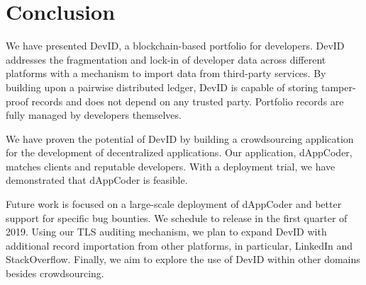 \section{Conclusion}
We have presented DevID, a blockchain-based portfolio for developers.
DevID addresses the fragmentation and lock-in of developer data across different platforms with a mechanism to import data from third-party services.
By building upon a pairwise distributed ledger, DevID is capable of storing tamper-proof records and does not depend on any trusted party.
Portfolio records are fully managed by developers themselves.

We have proven the potential of DevID by building a crowdsourcing application for the development of decentralized applications.
Our application, dAppCoder, matches clients and reputable developers.
With a deployment trial, we have demonstrated that dAppCoder is feasible.

Future work is focused on a large-scale deployment of dAppCoder and better support for specific bug bounties.
We schedule to release in the first quarter of 2019.
Using our TLS auditing mechanism, we plan to expand DevID with additional record importation from other platforms, in particular, LinkedIn and StackOverflow.
Finally, we aim to explore the use of DevID within other domains besides crowdsourcing.